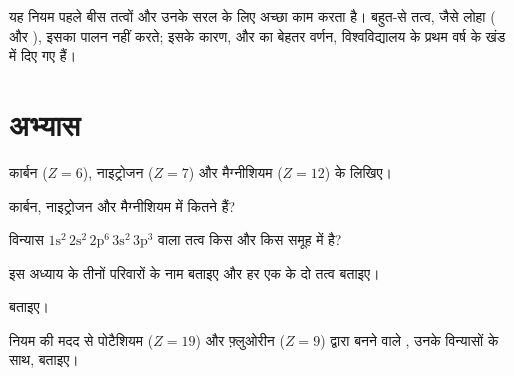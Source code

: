 \begin{remark}[नियम की सीमाएँ]\label{rem:g10:electron-shells:limits}
यह नियम पहले बीस तत्वों और उनके सरल  के लिए अच्छा काम करता है। बहुत-से तत्व,
जैसे लोहा ( और ), इसका पालन नहीं करते; इसके कारण, और
 का बेहतर वर्णन, विश्वविद्यालय के प्रथम वर्ष के खंड में
दिए गए हैं।
\end{remark}

\section{अभ्यास}

\begin{exercise}[$\star$]\label{exo:g10:electron-shells:1}
कार्बन ($Z = 6$), नाइट्रोजन ($Z = 7$) और मैग्नीशियम ($Z = 12$) के  लिखिए।
\end{exercise}

\begin{exercise}[$\star$]\label{exo:g10:electron-shells:2}
कार्बन, नाइट्रोजन और मैग्नीशियम में कितने  हैं?
\end{exercise}

\begin{exercise}[$\star$]\label{exo:g10:electron-shells:3}
विन्यास
$1\mathrm{s}^2\,2\mathrm{s}^2\,2\mathrm{p}^6\,3\mathrm{s}^2\,3\mathrm{p}^3$ वाला तत्व किस  और किस समूह में है?
\end{exercise}

\begin{exercise}[$\star$]\label{exo:g10:electron-shells:4}
इस अध्याय के तीनों परिवारों के नाम बताइए और हर एक के दो तत्व बताइए।
\end{exercise}

\begin{exercise}[$\star$]\label{exo:g10:electron-shells:5}
 बताइए।
\end{exercise}

\begin{exercise}[$\star\star$]\label{exo:g10:electron-shells:6}
 नियम की मदद से पोटैशियम ($Z = 19$) और फ़्लुओरीन ($Z = 9$) द्वारा
बनने वाले , उनके विन्यासों के साथ, बताइए।
\end{exercise}


